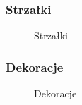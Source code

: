 \documentclass[10pt,t]{beamer}
\begin{document}
\begin{frame}
  \frametitle{Strzałki}




  \begin{figure}

    \centering

    \begin{tikzpicture}







    \end{tikzpicture}


    \caption{Strzałki}

  \end{figure}

\end{frame}





\begin{frame}
  \frametitle{Dekoracje}


  \begin{figure}

    \centering

    \begin{tikzpicture}






    \end{tikzpicture}


    \caption{Dekoracje}

  \end{figure}

\end{frame}
\end{document}
